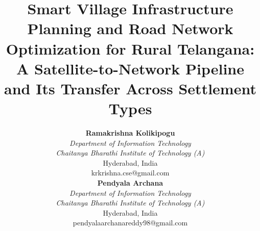 \documentclass[journal]{IEEEtran}
\begin{document}
\title{Smart Village Infrastructure Planning and Road Network Optimization for Rural Telangana: A Satellite-to-Network Pipeline and Its Transfer Across Settlement Types}
\author{%
\begin{minipage}[t]{0.47\textwidth}\centering
\textbf{Ramakrishna Kolikipogu}\\
\textit{Department of Information Technology}\\
\textit{Chaitanya Bharathi Institute of Technology (A)}\\
Hyderabad, India\\
krkrishna.cse@gmail.com
\end{minipage}\hfill
\begin{minipage}[t]{0.47\textwidth}\centering
\textbf{Pendyala Archana}\\
\textit{Department of Information Technology}\\
\textit{Chaitanya Bharathi Institute of Technology (A)}\\
Hyderabad, India\\
pendyalaarchanareddy98@gmail.com
\end{minipage}\\[10pt]}
\maketitle
\end{document}
